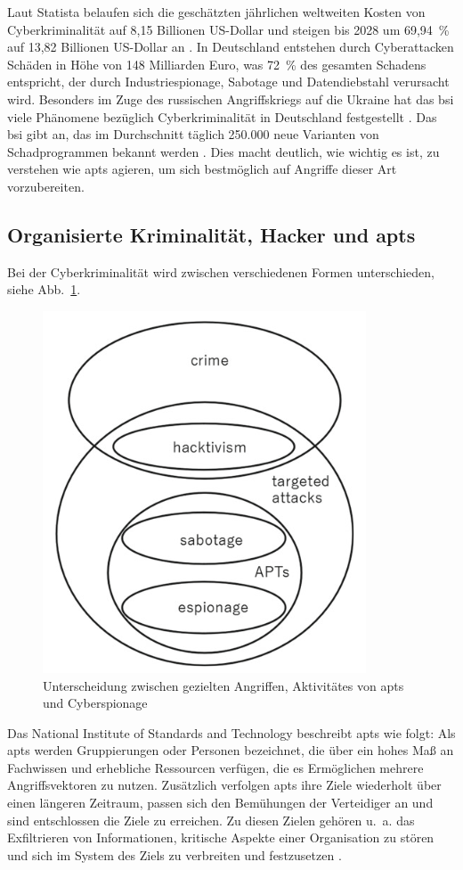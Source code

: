\documentclass[conference]{IEEEtran}
\begin{document}
Laut Statista belaufen sich die geschätzten jährlichen weltweiten Kosten von Cyberkriminalität auf 8,15 Billionen US-Dollar und steigen bis 2028 um 69,94~\% auf 13,82 Billionen US-Dollar an \cite{Statista2023}.
In Deutschland entstehen durch Cyberattacken Schäden in Höhe von 148 Milliarden Euro, was 72~\% des gesamten Schadens entspricht, der durch Industriespionage, Sabotage und Datendiebstahl verursacht wird.
Besonders im Zuge des russischen Angriffskriegs auf die Ukraine hat das \ac{bsi} viele Phänomene bezüglich Cyberkriminalität in Deutschland festgestellt \cite[S.~25]{BSI2023}.
Das \ac{bsi} gibt an, das im Durchschnitt täglich 250.000 neue Varianten von Schadprogrammen bekannt werden \cite[S.~13]{BSI2023}.
Dies macht deutlich, wie wichtig es ist, zu verstehen wie \acp{apt} agieren, um sich bestmöglich auf Angriffe dieser Art vorzubereiten.

\subsection{Organisierte Kriminalität, Hacker und \aclp*{apt}}
\label{sec:introduction:apt}

Bei der Cyberkriminalität wird zwischen verschiedenen Formen unterschieden, siehe Abb.~\ref{fig.destinction}.
\begin{figure}[htbp]
    \centerline{\includegraphics[scale=0.8]{figures/Destinction between targeted attacks, activity by APTs, and cyber-espionage.png}}
    \caption{Unterscheidung zwischen gezielten Angriffen, Aktivitätes von \acp{apt} und Cyberspionage \protect\cite[S.~6]{Steffens2020}}
    \label{fig.destinction}
\end{figure}
Das National Institute of Standards and Technology beschreibt \acp{apt} wie folgt:
Als \acp{apt} werden Gruppierungen oder Personen bezeichnet, die über ein hohes Maß an Fachwissen und erhebliche Ressourcen verfügen, die es Ermöglichen mehrere Angriffsvektoren zu nutzen.
Zusätzlich verfolgen \acp{apt} ihre Ziele wiederholt über einen längeren Zeitraum, passen sich den Bemühungen der Verteidiger an und sind entschlossen die Ziele zu erreichen.
Zu diesen Zielen gehören u.~a. das Exfiltrieren von Informationen, kritische Aspekte einer Organisation zu stören und sich im System des Ziels zu verbreiten und festzusetzen \cite[S.~B-1]{NIST2011}.
\end{document}
